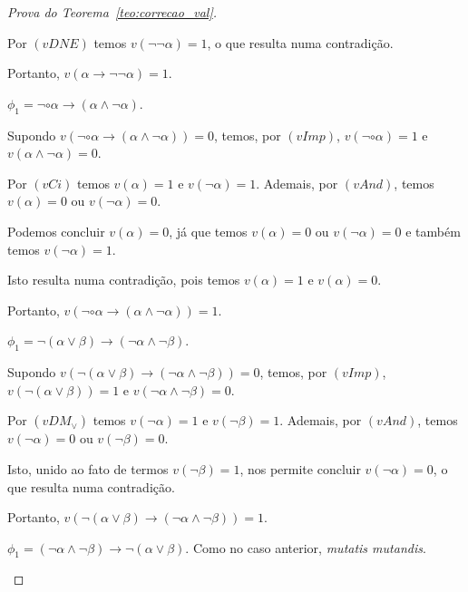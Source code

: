 \begin{proof}[Prova do Teorema~\ref{teo:correcao_val}]
\begin{provaporcasos}
\begin{provaporsubcasos}
                        Por $(vDNE)$ temos $v(\neg \neg \alpha) = 1$, o que resulta numa contradição. 
                        
                        Portanto, $v(\alpha \to \neg \neg \alpha) = 1$.
    
                    \subcasodeprova{} $\phi_{1} = \neg \circ \alpha \to (\alpha \land \neg \alpha)$. 
                    
                        Supondo $v(\neg \circ \alpha \to (\alpha \land \neg \alpha)) = 0$, temos, por $(vImp)$, $v(\neg \circ \alpha) = 1$ e $v(\alpha \land \neg \alpha) = 0$. 
                        
                        Por $(vCi)$ temos $v(\alpha) = 1$ e $v(\neg \alpha) = 1$. Ademais, por $(vAnd)$, temos $v(\alpha) = 0$ ou $v(\neg \alpha) = 0$. 
                        
                        Podemos concluir $v(\alpha) = 0$, já que temos $v(\alpha) = 0$ ou $v(\neg \alpha) = 0$ e também temos $v(\neg \alpha) = 1$. 
                        
                        Isto resulta numa contradição, pois temos $v(\alpha) = 1$ e  $v(\alpha) = 0$. 
                        
                        Portanto, $v(\neg \circ \alpha \to (\alpha \land \neg \alpha)) = 1$.
    
                    \subcasodeprova{} $\phi_{1} = \neg (\alpha \lor \beta) \to (\neg \alpha \land \neg \beta)$. 
                    
                        Supondo $v(\neg (\alpha \lor \beta) \to (\neg \alpha \land \neg \beta)) = 0$, temos, por $(vImp)$, $v(\neg (\alpha \lor \beta)) = 1$ e $v(\neg \alpha \land \neg \beta) = 0$. 
                        
                        Por $(vDM_{\lor})$ temos $v(\neg \alpha) = 1$ e $v(\neg \beta) = 1$. Ademais, por $(vAnd)$, temos $v(\neg \alpha) = 0$ ou $v(\neg \beta) = 0$. 
                        
                        Isto, unido ao fato de termos $v(\neg \beta) = 1$, nos permite concluir $v(\neg \alpha) = 0$, o que resulta numa contradição. 
                        
                        Portanto, $v(\neg (\alpha \lor \beta) \to (\neg \alpha \land \neg \beta)) = 1$.
    
    
                    \subcasodeprova{} $\phi_{1} = (\neg \alpha \land \neg \beta) \to \neg (\alpha \lor \beta)$. Como no caso anterior, \textit{mutatis mutandis}.
    

\end{provaporsubcasos}
\end{provaporcasos}
\end{proof}
